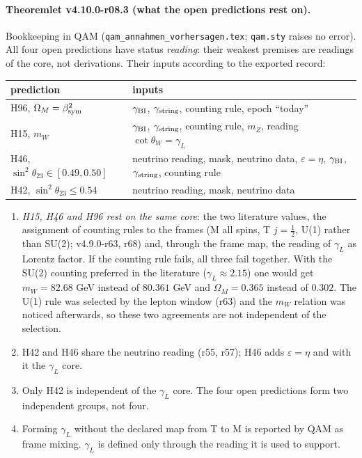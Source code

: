 \paragraph{Theoremlet v4.10.0-r08.3 (what the open predictions rest on).}
Bookkeeping in QAM (\texttt{qam\_\allowbreak annahmen\_\allowbreak vorhersagen.tex}; \texttt{qam.sty} raises no error).  All four open predictions have status
\emph{reading}: their weakest premises are readings of the core, not derivations.  Their inputs according to the exported record:
\begin{center}
\small
\begin{tabular}{@{}>{\raggedright\arraybackslash}p{}>{\raggedright\arraybackslash}p{}@{}}
\toprule
prediction & inputs\\
\midrule
H96, \(\Omega_M=\beta_{\rm sym}^2\) & \(\gamma_{\rm BI}\), \(\gamma_{\rm string}\), counting rule, epoch ``today''\\
H15, \(m_W\) & \(\gamma_{\rm BI}\), \(\gamma_{\rm string}\), counting rule, \(m_Z\), reading \(\cot\theta_W=\gamma_L\)\\
H46, \(\sin^2\theta_{23}\in[0.49,0.50]\) & neutrino reading, mask, neutrino data, \(\varepsilon=\eta\), \(\gamma_{\rm BI}\), \(\gamma_{\rm string}\), counting rule\\
H42, \(\sin^2\theta_{23}\le0.54\) & neutrino reading, mask, neutrino data\\
\bottomrule
\end{tabular}
\end{center}
\begin{enumerate}[leftmargin=2em]
\item[(a)] \emph{H15, H46 and H96 rest on the same core}: the two literature values, the assignment of counting rules to the frames (M all spins, T
\(j=\tfrac12\), U(1) rather than SU(2); v4.9.0-r63, r68) and, through the frame map, the reading of \(\gamma_L\) as Lorentz factor.  If the counting rule
fails, all three fail together.  With the SU(2) counting preferred in the literature (\(\gamma_L\approx2.15\)) one would get \(m_W=82.68\) GeV instead of
\(80.361\) GeV and \(\Omega_M=0.365\) instead of \(0.302\).  The U(1) rule was selected by the lepton window (r63) and the \(m_W\) relation was noticed
afterwards, so these two agreements are not independent of the selection.
\item[(b)] H42 and H46 share the neutrino reading (r55, r57); H46 adds \(\varepsilon=\eta\) and with it the \(\gamma_L\) core.
\item[(c)] Only H42 is independent of the \(\gamma_L\) core.  The four open predictions form two independent groups, not four.
\item[(d)] Forming \(\gamma_L\) without the declared map from T to M is reported by QAM as frame mixing.  \(\gamma_L\) is defined only through the reading it
is used to support.
\end{enumerate}

